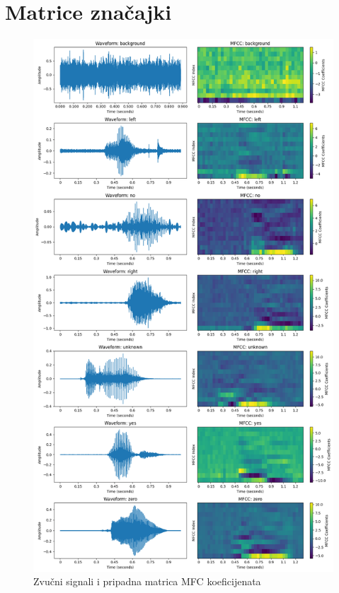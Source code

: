 \chapter{Matrice značajki}
\label{add:mfccpython}

\begin{figure}[htb]
    \centering
    \includegraphics[width=0.65\linewidth]{Chapters/neuronska_mreza/dataset/mfcc.png} 
    \caption{Zvučni signali i pripadna matrica MFC koeficijenata}
\end{figure}